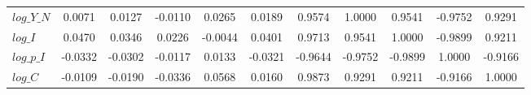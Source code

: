 \begin{center}
\begin{longtable}{lcccccccccc}
$log\_Y\_N  $	 & 	       0.0071	 & 	       0.0127	 & 	      -0.0110	 & 	       0.0265	 & 	       0.0189	 & 	       0.9574	 & 	       1.0000	 & 	       0.9541	 & 	      -0.9752	 & 	       0.9291 \\ 
$log\_I     $	 & 	       0.0470	 & 	       0.0346	 & 	       0.0226	 & 	      -0.0044	 & 	       0.0401	 & 	       0.9713	 & 	       0.9541	 & 	       1.0000	 & 	      -0.9899	 & 	       0.9211 \\ 
$log\_p\_I  $	 & 	      -0.0332	 & 	      -0.0302	 & 	      -0.0117	 & 	       0.0133	 & 	      -0.0321	 & 	      -0.9644	 & 	      -0.9752	 & 	      -0.9899	 & 	       1.0000	 & 	      -0.9166 \\ 
$log\_C     $	 & 	      -0.0109	 & 	      -0.0190	 & 	      -0.0336	 & 	       0.0568	 & 	       0.0160	 & 	       0.9873	 & 	       0.9291	 & 	       0.9211	 & 	      -0.9166	 & 	       1.0000 \\ 
\end{longtable}
 \end{center}
